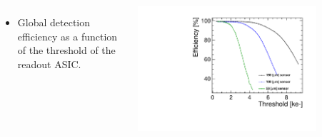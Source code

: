 \begin{frame}
\begin{columns}[t]
  \end{columns}

  \vspace{-1cm}
  \begin{columns}
    \begin{itemize}
    \item Global detection efficiency as a function of the threshold
      of the readout ASIC.
    \end{itemize}

    \centering
    \includegraphics[width=0.8\textwidth]{../figures/TestBeam/Efficiency_vs_THL.pdf}
  \end{columns}
  
\end{frame}

